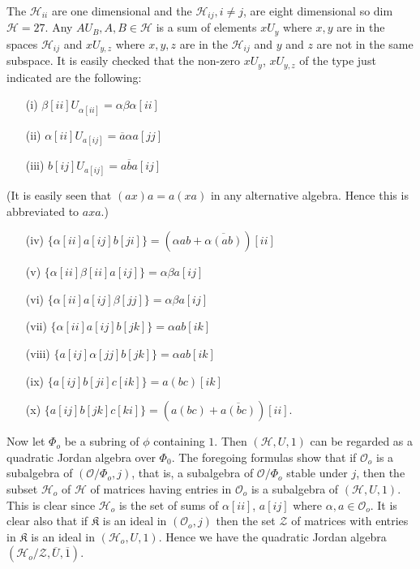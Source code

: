 The $\mathscr{H}_{ii}$ are one dimensional and the
$\mathscr{H}_{ij},i\neq j$, are eight dimensional so dim
$\mathscr{H}=27$. Any $AU_B, A,B\in \mathscr{H}$ is a sum of
elements $xU_y$ where $x,y$ are in the spaces $\mathscr{H}_{ij}$ and
$xU_{y,z}$ where $x,y,z$ are in the $\mathscr{H}_{ij}$ and $y$ and $z$
are not in the same subspace. It is easily checked that the non-zero
$xU_y$, $xU_{y,z}$ of the type just indicated are the following:
\begin{itemize}
\item[(i)] $\beta [ii]U_{\alpha[ii]}=\alpha\beta\alpha[ii]$

\item[(ii)] $\alpha[ii]U_{a[ij]}=\overline{a}\alpha a[jj]$

\item[(iii)] $b[ij]U_{a[ij]}=a\overline{b}a[ij]$
\end{itemize}
(It is easily seen that $(ax)a=a(xa)$ in any alternative
algebra. Hence this is abbreviated to $axa$.)
\begin{itemize}
\item[(iv)] $\{\alpha[ii]a[ij]b[ji]\}=(\alpha
  ab+\overline{\alpha(ab)})[ii]$

\item[(v)] $\{\alpha[ii] \beta[ii]a[ij]\}=\alpha \beta a[ij]$

\item[(vi)] $\{\alpha[ii] a[ij] \beta[jj]\}=\alpha \beta a[ij]$

\item[(vii)] $\{\alpha[ii]a[ij]b[jk]\}=\alpha ab[ik]$

\item[(viii)] $\{a[ij]\alpha[jj]b[jk]\}=\alpha ab [ik]$\pageoriginale

\item[(ix)] $\{a[ij]b[ji]c[ik]\}=a(bc)[ik]$

\item[(x)] $\{a[ij] b[jk] c[ki]\}=(a(bc)+\overline{a(bc)})[ii]$.
\end{itemize}

Now let $\Phi_o$ be a subring of $\phi$ containing $1$. Then
$(\mathscr{H},U,1)$ can be regarded as a quadratic Jordan algebra over
$\Phi_0$. The foregoing formulas show that if $\mathcal{O}_o$ is a
subalgebra of $(\mathcal{O}/\Phi_o,j)$, that is, a subalgebra of
$\mathcal{O}/\Phi_o$ stable under $j$, then the subset $\mathscr{H}_o$
of $\mathscr{H}$ of matrices having entries in $\mathcal{O}_o$ is a
subalgebra of $(\mathscr{H},U,1)$. This is clear since $\mathscr{H}_o$
is the set of sums of $\alpha[ii]$, $a[ij]$ where $\alpha, a\in
\mathcal{O}_o$. It is clear also that if $\mathfrak{K}$ is an ideal in
$(\mathcal{O}_o,j)$ then the set $\mathscr{Z}$ of matrices with
entries in $\mathfrak{K}$ is an ideal in $(\mathscr{H}_o,U,1)$. Hence
we have the quadratic Jordan algebra
$(\mathscr{H}_o/\mathscr{Z},\overline{U}, \overline{1})$.

